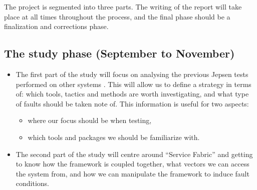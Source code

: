 \documentclass[a4paper,10pt,titlepage]{report}
\begin{document}
The project is segmented into three parts. The writing of the report will take place at all times throughout the process, and the final phase should be a finalization and corrections phase.  
\subsection{The study phase  (September to November)}
\begin{itemize}
\item	The first part of the study will focus on analysing the previous Jepsen tests performed on other systems \cite{jepsenpasttest}. This will allow us to define a strategy in terms of: which tools, tactics and methods are worth investigating, and what type of faults should be taken note of. This information is useful for two aspects:  
\begin{itemize}
\item	where our focus should be when testing,  
\item	which tools and packages we should be familiarize with. 
\end{itemize}
\item	 The second part of the study will centre around “Service Fabric” and getting to know how the framework is coupled together, what vectors we can access the system from, and how we can manipulate the framework to induce fault conditions.   
\end{itemize}
\end{document}
